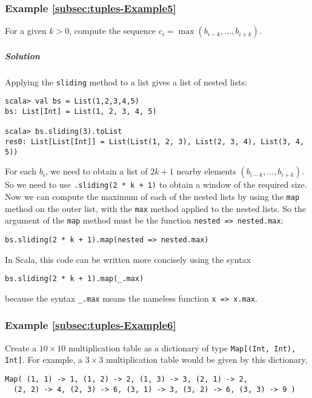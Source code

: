 \subsubsection{Example \label{subsec:tuples-Example5}\ref{subsec:tuples-Example5}}

For a given $k>0$, compute the sequence $c_{i}=\max(b_{i-k},...,b_{i+k})$.

\subparagraph{Solution}

Applying the \lstinline!sliding! method to a list gives a list of
nested lists:
\begin{lstlisting}
scala> val bs = List(1,2,3,4,5)
bs: List[Int] = List(1, 2, 3, 4, 5)

scala> bs.sliding(3).toList
res0: List[List[Int]] = List(List(1, 2, 3), List(2, 3, 4), List(3, 4, 5)) 
\end{lstlisting}
For each $b_{i}$, we need to obtain a list of $2k+1$ nearby elements
$\left(b_{i-k},...,b_{i+k}\right)$. So we need to use \lstinline!.sliding(2 * k + 1)!
to obtain a window of the required size. Now we can compute the maximum
of each of the nested lists by using the \lstinline!map! method on
the outer list, with the \lstinline!max! method applied to the nested
lists. So the argument of the \lstinline!map! method must be the
function \lstinline!nested => nested.max!:

\begin{lstlisting}
bs.sliding(2 * k + 1).map(nested => nested.max)
\end{lstlisting}
In Scala, this code can be written more concisely using the syntax
\begin{lstlisting}
bs.sliding(2 * k + 1).map(_.max)
\end{lstlisting}
because the syntax \lstinline!_.max! means the nameless function
\lstinline!x => x.max!.

\subsubsection{Example \label{subsec:tuples-Example6}\ref{subsec:tuples-Example6}}

Create a $10\times10$ multiplication table as a dictionary of type
\lstinline!Map[(Int, Int), Int]!. For example, a $3\times3$ multiplication
table would be given by this dictionary,
\begin{lstlisting}
Map( (1, 1) -> 1, (1, 2) -> 2, (1, 3) -> 3, (2, 1) -> 2,
  (2, 2) -> 4, (2, 3) -> 6, (3, 1) -> 3, (3, 2) -> 6, (3, 3) -> 9 )
\end{lstlisting}

